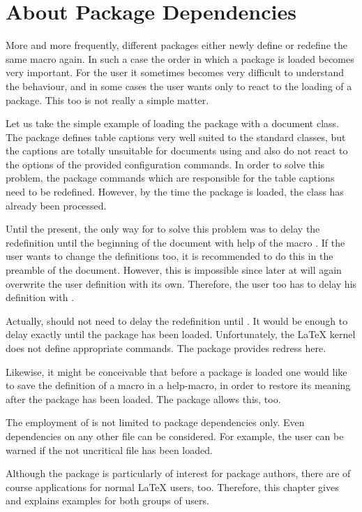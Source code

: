 \section{About Package Dependencies}
\label{sec:scrlfile.dependency}
\begin{Explain}
  More and more frequently, different packages either newly define or
  redefine the same macro again.  In such a case the order in which a
  package is loaded becomes very important.  For the user it sometimes
  becomes very difficult to understand the behaviour, and in some
  cases the user wants only to react to the loading of a package. This
  too is not really a simple matter.

  Let us take the simple example of loading the package
   with a {\KOMAScript} document class.  The
   package defines table captions very well suited
  to the standard classes, but the captions are totally unsuitable for
  documents using {\KOMAScript} and also do not react to the options
  of the provided configuration commands.  In order to solve this
  problem, the  package commands which are
  responsible for the table captions need to be redefined. However, by
  the time the  package is loaded, the
  {\KOMAScript} class has already been processed.

  Until the present, the only way for {\KOMAScript} to solve this
  problem was to delay the redefinition until the beginning of the
  document with help of the macro .  If the
  user wants to change the definitions too, it is recommended to do
  this in the preamble of the document.  However, this is impossible
  since later at  {\KOMAScript} will
  again overwrite the user definition with its own.  Therefore, the
  user too has to delay his definition with .
  
  Actually, {\KOMAScript} should not need to delay the redefinition
  until .  It would be enough to
  delay exactly until the package  has been
  loaded. Unfortunately, the {\LaTeX} kernel does not define
  appropriate commands. The package  provides
  redress here.
  
  Likewise, it might be conceivable that before a package is loaded
  one would like to save the definition of a macro in a help-macro, in
  order to restore its meaning after the package has been loaded. The
  package  allows this, too.
  
  The employment of  is not limited to package
  dependencies only.  Even dependencies on any other file can be
  considered.  For example, the user can be warned if the not
  uncritical file  has been loaded.
  
  Although the package is particularly of interest for package
  authors, there are of course applications for normal {\LaTeX} users,
  too.  Therefore, this chapter gives and explains examples for both
  groups of users.
\end{Explain}


